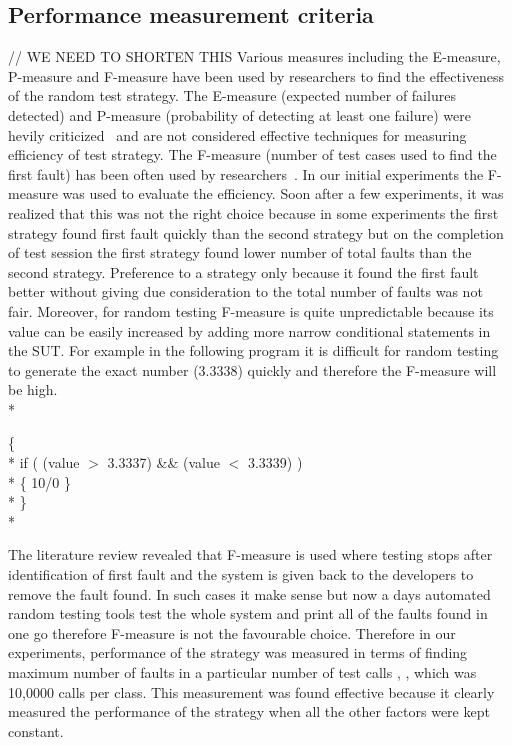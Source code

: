 \documentclass[conference]{IEEEtran}
\begin{document}
\subsection{Performance measurement criteria}
// WE NEED TO SHORTEN THIS
Various measures including the E-measure, P-measure and F-measure have been used by researchers to find the effectiveness of the random test strategy. The E-measure (expected number of failures detected) and P-measure (probability of detecting at least one failure) were hevily criticized~\cite{Chen2008} and are not considered effective techniques for measuring efficiency of test strategy. The F-measure (number of test cases used to find the first fault) has been often used by researchers~\cite{Chen1996,Chen2004}. In our initial experiments the F-measure was used to evaluate the efficiency. Soon after a few experiments, it was realized that this was not the right choice because in some experiments the first strategy found first fault quickly than the second strategy but on the completion of test session the first strategy found lower number of total faults than the second strategy. Preference to a strategy only because it found the first fault better without giving due consideration to the total number of faults was not fair. Moreover, for random testing F-measure is quite unpredictable because its value can be easily increased by adding more narrow conditional statements in the SUT. For example in the following program it is difficult for random testing to generate the exact number (3.3338) quickly and therefore the F-measure will be high.\\*

\begingroup
    \fontsize{7pt}{8pt}\selectfont
\noindent
\{ \\*
\indent if ( (value $>$  3.3337) \&\& (value $<$ 3.3339) )\\*
\indent \{ 10/0 \} \\* 
\} \\*
\endgroup
  
The literature review revealed that F-measure is used where testing stops after identification of first fault and the system is given back to the developers to remove the fault found. In such cases it make sense but now a days automated random testing tools test the whole system and print all of the faults found in one go therefore F-measure is not the favourable choice. Therefore in our experiments, performance of the strategy was measured in terms of finding maximum number of faults in a particular number of test calls  \cite{Ciupa2007}, \cite{Pacheco2007a}, \cite{Ciupa2008b} which was 10,0000 calls per class. This measurement was found effective because it clearly measured the performance of the strategy when all the other factors were kept constant.
\end{document}
